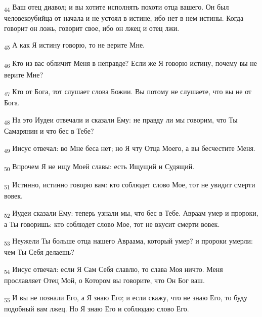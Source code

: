 \begin{tcolorbox}
\textsubscript{44} Ваш отец диавол; и вы хотите исполнять похоти отца вашего. Он был человекоубийца от начала и не устоял в истине, ибо нет в нем истины. Когда говорит он ложь, говорит свое, ибо он лжец и отец лжи.
\end{tcolorbox}
\begin{tcolorbox}
\textsubscript{45} А как Я истину говорю, то не верите Мне.
\end{tcolorbox}
\begin{tcolorbox}
\textsubscript{46} Кто из вас обличит Меня в неправде? Если же Я говорю истину, почему вы не верите Мне?
\end{tcolorbox}
\begin{tcolorbox}
\textsubscript{47} Кто от Бога, тот слушает слова Божии. Вы потому не слушаете, что вы не от Бога.
\end{tcolorbox}
\begin{tcolorbox}
\textsubscript{48} На это Иудеи отвечали и сказали Ему: не правду ли мы говорим, что Ты Самарянин и что бес в Тебе?
\end{tcolorbox}
\begin{tcolorbox}
\textsubscript{49} Иисус отвечал: во Мне беса нет; но Я чту Отца Моего, а вы бесчестите Меня.
\end{tcolorbox}
\begin{tcolorbox}
\textsubscript{50} Впрочем Я не ищу Моей славы: есть Ищущий и Судящий.
\end{tcolorbox}
\begin{tcolorbox}
\textsubscript{51} Истинно, истинно говорю вам: кто соблюдет слово Мое, тот не увидит смерти вовек.
\end{tcolorbox}
\begin{tcolorbox}
\textsubscript{52} Иудеи сказали Ему: теперь узнали мы, что бес в Тебе. Авраам умер и пророки, а Ты говоришь: кто соблюдет слово Мое, тот не вкусит смерти вовек.
\end{tcolorbox}
\begin{tcolorbox}
\textsubscript{53} Неужели Ты больше отца нашего Авраама, который умер? и пророки умерли: чем Ты Себя делаешь?
\end{tcolorbox}
\begin{tcolorbox}
\textsubscript{54} Иисус отвечал: если Я Сам Себя славлю, то слава Моя ничто. Меня прославляет Отец Мой, о Котором вы говорите, что Он Бог ваш.
\end{tcolorbox}
\begin{tcolorbox}
\textsubscript{55} И вы не познали Его, а Я знаю Его; и если скажу, что не знаю Его, то буду подобный вам лжец. Но Я знаю Его и соблюдаю слово Его.
\end{tcolorbox}
